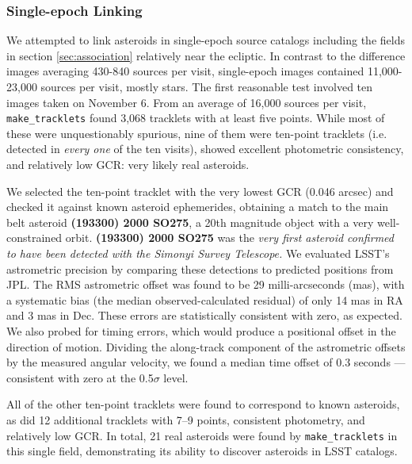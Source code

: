 \subsubsection{Single-epoch Linking}
\label{sec:linking}

We attempted to link asteroids in single-epoch source catalogs including the fields in section \ref{sec:association} relatively near the ecliptic. In contrast to the difference images averaging 430-840 sources per visit, single-epoch images contained 11,000-23,000 sources per visit, mostly stars. The first reasonable test involved ten images taken on November 6. From an average of 16,000 sources per visit, {\tt make\_tracklets} found 3,068 tracklets with at least five points. While most of these were unquestionably spurious, nine of them were ten-point tracklets (i.e. detected in {\em every one} of the ten visits), showed excellent photometric consistency, and relatively low GCR: very likely real asteroids.

We selected the ten-point tracklet with the very lowest GCR (0.046 arcsec) and checked it against known asteroid ephemerides, obtaining a match to the main belt asteroid \textbf{(193300) 2000 SO275}, a 20th magnitude object with a very well-constrained orbit. \textbf{(193300) 2000 SO275} was the {\em very first asteroid confirmed to have been detected with the Simonyi Survey Telescope.} We evaluated LSST's astrometric precision by comparing these detections to predicted positions from JPL. The RMS astrometric offset was found to be 29 milli-arcseconds (mas), with a systematic bias (the median observed-calculated residual) of only 14 mas in RA and 3 mas in Dec. These errors are statistically consistent with zero, as expected. We also probed for timing errors, which would produce a positional offset in the direction of motion. Dividing the along-track component of the astrometric offsets by the measured angular velocity, we found a median time offset of 0.3 seconds --- consistent with zero at the 0.5$\sigma$ level.

All of the other ten-point tracklets were found to correspond to known asteroids, as did 12 additional tracklets with 7--9 points, consistent photometry, and relatively low GCR. In total, 21 real asteroids were found by {\tt make\_tracklets} in this single field, demonstrating its ability to discover asteroids in LSST catalogs.
